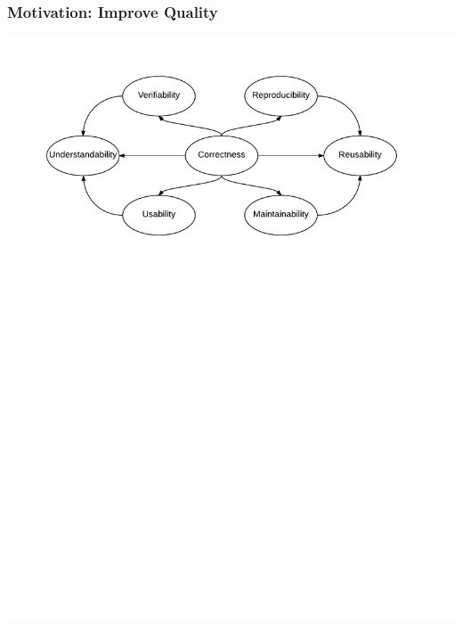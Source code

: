\documentclass[t,12pt,numbers,fleqn]{beamer}
\begin{document}
\begin{frame}

\frametitle{Motivation: Improve Quality}

\includegraphics[width=1.\textwidth]{../Figures/RelationBWQualities.pdf}

\end{frame}





\end{document}
